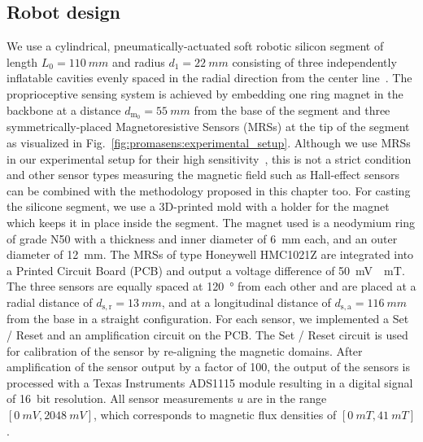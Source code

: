 \subsection{Robot design}\label{sub:promasens:robot_design}
We use a cylindrical, pneumatically-actuated soft robotic silicon segment of length $L_{0}=\SI{110}{mm}$ and radius $d_1 = \SI{22}{mm}$ consisting of three independently inflatable cavities evenly spaced in the radial direction from the center line~\cite{marchese2015recipe}. 
%
The proprioceptive sensing system is achieved by embedding one ring magnet in the backbone at a distance $d_{\mathrm{m}_0} = \SI{55}{mm}$ from the base of the segment and three symmetrically-placed Magnetoresistive Sensors (MRSs) at the tip of the segment as visualized in Fig.~\ref{fig:promasens:experimental_setup}. %
Although we use MRSs in our experimental setup for their high sensitivity~\cite{popovic2002bridging}, this is not a strict condition and other sensor types measuring the magnetic field such as Hall-effect sensors can be combined with the methodology proposed in this chapter too.
For casting the silicone segment, we use a 3D-printed mold with a holder for the magnet which keeps it in place inside the segment.
The magnet used is a neodymium ring of grade N50 with a thickness and inner diameter of \SI{6}{mm} each, and an outer diameter of \SI{12}{mm}.
%
The MRSs of type Honeywell HMC1021Z are integrated into a Printed Circuit Board (PCB) and output a voltage difference of \SI{50}{mV \per mT}. %
The three sensors are equally spaced at \SI{120}{\degree} from each other and are placed at a radial distance of $d_{\mathrm{s},\mathrm{r}} = \SI{13}{mm}$, and at a longitudinal distance of $d_{\mathrm{s},\mathrm{a}} = \SI{116}{mm}$ from the base in a straight configuration.
For each sensor, we implemented a Set / Reset and an amplification circuit on the PCB.
The Set / Reset circuit is used for calibration of the sensor by re-aligning the magnetic domains. After amplification of the sensor output by a factor of 100, the output of the sensors is processed with a Texas Instruments ADS1115 module %
resulting in a digital signal of \SI{16}{bit} resolution. All sensor measurements $u$ are in the range $[\SI{0}{mV}, \SI{2048}{mV}]$, which corresponds to magnetic flux densities of  $[\SI{0}{mT}, \SI{41}{mT}]$.

